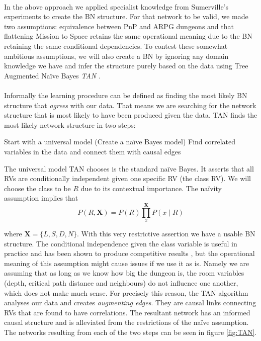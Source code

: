 \documentclass{UoYCSproject}
\begin{document}
\paragraph{}
In the above approach we applied specialist knowledge from Sumerville's experiments to create the BN structure. For that network to be valid, we made two assumptions: equivalence between PnP and ARPG dungeons and that flattening Mission to Space retains the same operational meaning due to the BN retaining the same conditional dependencies. To contest these somewhat ambitious assumptions, we will also create a BN by ignoring any domain knowledge we have and infer the structure purely based on the data using Tree Augmented Na\"{i}ve Bayes \textit{TAN} \parencite{FriedmanTAN}.
\paragraph{}
Informally the learning procedure can be defined as finding the most likely BN structure that \textit{agrees} with our data. That means we are searching for the network structure that is most likely to have been produced given the data. TAN finds the most likely network structure in two steps:

\begin{outline}[enumerate]
  \1 Start with a universal model (Create a na\"{i}ve Bayes model)
  \1 Find correlated variables in the data and connect them with causal edges
\end{outline}

The universal model TAN chooses is the standard na\"{i}ve Bayes. It asserts that all RVs are conditionally independent given one specific RV (the class RV). We will choose the class to be \(R\) due to its contextual importance. The na\"{i}vity assumption implies that
\begin{equation}
  \label{eq:TAN}
  P(R,\boldsymbol X) = P(R)\prod_{x}^{\boldsymbol X} P(x \mid R)
\end{equation}

where \(\boldsymbol X = \{L, S, D, N\}\). With this very restrictive assertion we have a usable BN structure. The conditional independence given the class variable is useful in practice and has been shown to produce competitive results \parencite{RishEmpiricalBayes}, but the operational meaning of this assumption might cause issues if we use it as is. Namely we are assuming that as long as we know how big the dungeon is, the room variables (depth, critical path distance and neighbours) do not influence one another, which does not make much sense. For precisely this reason, the TAN algorithm analyses our data and creates \textit{augmenting edges}. They are causal links connecting RVs that are found to have correlations. The resultant network has an informed causal structure and is alleviated from the restrictions of the na\"{i}ve assumption. The networks resulting from each of the two steps can be seen in figure \ref{fig:TAN}.
\end{document}
